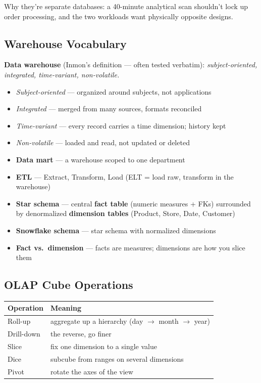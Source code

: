 \documentclass[12pt]{article}
\begin{document}
Why they're separate databases: a 40-minute analytical scan shouldn't lock up
order processing, and the two workloads want physically opposite designs.

\subsection*{Warehouse Vocabulary}

\textbf{Data warehouse} (Inmon's definition --- often tested verbatim):
\emph{subject-oriented, integrated, time-variant, non-volatile.}

\begin{itemize}
    \item \emph{Subject-oriented} --- organized around subjects, not applications
    \item \emph{Integrated} --- merged from many sources, formats reconciled
    \item \emph{Time-variant} --- every record carries a time dimension; history kept
    \item \emph{Non-volatile} --- loaded and read, not updated or deleted
\end{itemize}

\begin{itemize}
    \item \textbf{Data mart} --- a warehouse scoped to one department
    \item \textbf{ETL} --- Extract, Transform, Load (ELT = load raw, transform in the warehouse)
    \item \textbf{Star schema} --- central \textbf{fact table} (numeric measures + FKs)
    surrounded by denormalized \textbf{dimension tables} (Product, Store, Date, Customer)
    \item \textbf{Snowflake schema} --- star schema with normalized dimensions
    \item \textbf{Fact vs.\ dimension} --- facts are measures; dimensions are how you slice them
\end{itemize}

\subsection*{OLAP Cube Operations}

\begin{table}[H]
\centering
\begin{tabular}{|l|l|}
\hline
\textbf{Operation} & \textbf{Meaning} \\
\hline
Roll-up & aggregate up a hierarchy (day $\to$ month $\to$ year) \\
Drill-down & the reverse, go finer \\
Slice & fix one dimension to a single value \\
Dice & subcube from ranges on several dimensions \\
Pivot & rotate the axes of the view \\
\hline
\end{tabular}
\end{table}
\end{document}
